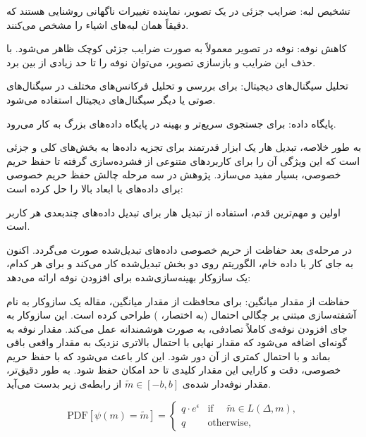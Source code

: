  تشخیص لبه: ضرایب جزئی در یک تصویر، نماینده تغییرات ناگهانی روشنایی هستند که دقیقاً همان لبه‌های اشیاء را مشخص می‌کنند.

 کاهش نوفه: نوفه در تصویر معمولاً به صورت ضرایب جزئی کوچک ظاهر می‌شود. با حذف این ضرایب و بازسازی تصویر، می‌توان نوفه را تا حد زیادی از بین برد.

 تحلیل سیگنال‌های دیجیتال: برای بررسی و تحلیل فرکانس‌های مختلف در سیگنال‌های صوتی یا دیگر سیگنال‌های دیجیتال استفاده می‌شود.

 پایگاه داده: برای جستجوی سریع‌تر و بهینه در پایگاه داده‌های بزرگ به کار می‌رود.


به طور خلاصه، تبدیل هار یک ابزار قدرتمند برای تجزیه داده‌ها به بخش‌های کلی و جزئی است که این ویژگی آن را برای کاربردهای متنوعی از فشرده‌سازی گرفته تا حفظ حریم خصوصی، بسیار مفید می‌سازد. پژوهش  در سه مرحله چالش حفظ حریم خصوصی برای داده‌های با ابعاد بالا را حل کرده است:

اولین و مهم‌ترین قدم، استفاده از تبدیل هار برای تبدیل داده‌های چندبعدی هر کاربر است. 

در مرحله‌ی بعد حفاظت از حریم خصوصی داده‌های تبدیل‌شده صورت می‌گردد. اکنون به جای کار با داده خام، الگوریتم روی دو بخش تبدیل‌شده کار می‌کند و برای هر کدام، یک سازوکار بهینه‌سازی‌شده برای افزودن نوفه ارائه می‌دهد:


 حفاظت از مقدار میانگین:  برای محافظت از مقدار میانگین، مقاله یک سازوکار به نام آشفته‌سازی مبتنی بر چگالی احتمال (به اختصار، ) طراحی کرده است. این سازوکار به جای افزودن نوفه‌ی کاملاً تصادفی، به صورت هوشمندانه عمل می‌کند. مقدار نوفه به گونه‌ای اضافه می‌شود که مقدار نهایی با احتمال بالاتری نزدیک به مقدار واقعی باقی بماند و با احتمال کمتری از آن دور شود. این کار باعث می‌شود که با حفظ حریم خصوصی، دقت و کارایی این مقدار کلیدی تا حد امکان حفظ شود. به طور دقیق‌تر، مقدار نوفه‌دار شده‌ی $\tilde{m} \in [-b,b]$ از رابطه‌ی زیر بدست می‌آید.

\begin{equation}
\text{PDF}[\psi(m) = \tilde{m}] = 
\begin{cases} 
q \cdot e^{\epsilon} & \text{if } \quad \tilde{m} \in L(\Delta, m), \\
q & \text{otherwise},
\end{cases}
\end{equation}

